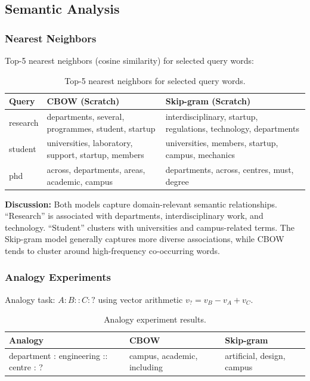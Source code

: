 \documentclass[12pt,a4paper]{article}
\begin{document}

\subsection{Semantic Analysis}

\subsubsection{Nearest Neighbors}
Top-5 nearest neighbors (cosine similarity) for selected query words:

\begin{table}[H]
\centering
\caption{Top-5 nearest neighbors for selected query words.}
\label{tab:neighbors}
\begin{tabular}{p{1.5cm}p{5.5cm}p{5.5cm}}
\toprule
\textbf{Query} & \textbf{CBOW (Scratch)} & \textbf{Skip-gram (Scratch)} \\
\midrule
research & departments, several, programmes, student, startup & interdisciplinary, startup, regulations, technology, departments \\
\midrule
student & universities, laboratory, support, startup, members & universities, members, startup, campus, mechanics \\
\midrule
phd & across, departments, areas, academic, campus & departments, across, centres, must, degree \\
\bottomrule
\end{tabular}
\end{table}

\textbf{Discussion:} Both models capture domain-relevant semantic relationships. ``Research'' is associated with departments, interdisciplinary work, and technology. ``Student'' clusters with universities and campus-related terms. The Skip-gram model generally captures more diverse associations, while CBOW tends to cluster around high-frequency co-occurring words.

\subsubsection{Analogy Experiments}
Analogy task: $A : B :: C : ?$ using vector arithmetic $v_? = v_B - v_A + v_C$.

\begin{table}[H]
\centering
\caption{Analogy experiment results.}
\label{tab:analogies}
\begin{tabular}{p{4cm}p{3.5cm}p{3.5cm}}
\toprule
\textbf{Analogy} & \textbf{CBOW} & \textbf{Skip-gram} \\
\midrule
department : engineering :: centre : ? & campus, academic, including & artificial, design, campus \\
\bottomrule
\end{tabular}
\end{table}
\end{document}
